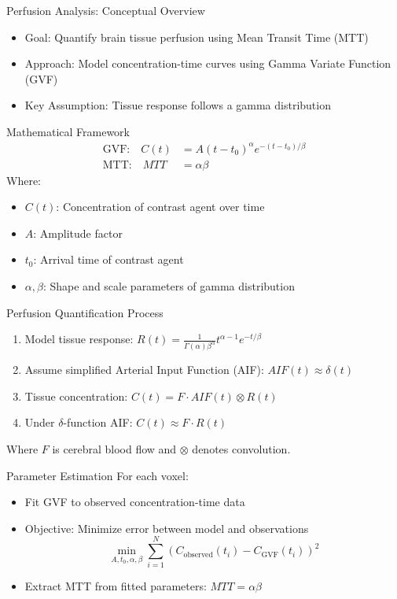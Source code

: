 \begin{frame}{Perfusion Analysis: Conceptual Overview}
\begin{itemize}
    \item Goal: Quantify brain tissue perfusion using Mean Transit Time (MTT)
    \item Approach: Model concentration-time curves using Gamma Variate Function (GVF)
    \item Key Assumption: Tissue response follows a gamma distribution
\end{itemize}
\end{frame}

\begin{frame}{Mathematical Framework}
\begin{align*}
    \text{GVF:} \quad C(t) &= A(t-t_0)^\alpha e^{-(t-t_0)/\beta} \\
    \text{MTT:} \quad MTT &= \alpha \beta
\end{align*}
Where:
\begin{itemize}
    \item $C(t)$: Concentration of contrast agent over time
    \item $A$: Amplitude factor
    \item $t_0$: Arrival time of contrast agent
    \item $\alpha, \beta$: Shape and scale parameters of gamma distribution
\end{itemize}
\end{frame}

\begin{frame}{Perfusion Quantification Process}
\begin{enumerate}
    \item Model tissue response: $R(t) = \frac{1}{\Gamma(\alpha)\beta^\alpha}t^{\alpha-1}e^{-t/\beta}$
    \item Assume simplified Arterial Input Function (AIF): $AIF(t) \approx \delta(t)$
    \item Tissue concentration: $C(t) = F \cdot AIF(t) \otimes R(t)$
    \item Under $\delta$-function AIF: $C(t) \approx F \cdot R(t)$
\end{enumerate}
Where $F$ is cerebral blood flow and $\otimes$ denotes convolution.
\end{frame}

\begin{frame}{Parameter Estimation}
For each voxel:
\begin{itemize}
    \item Fit GVF to observed concentration-time data
    \item Objective: Minimize error between model and observations
    \[ \min_{A,t_0,\alpha,\beta} \sum_{i=1}^{N} (C_{\text{observed}}(t_i) - C_{\text{GVF}}(t_i))^2 \]
    \item Extract MTT from fitted parameters: $MTT = \alpha \beta$
\end{itemize}
\end{frame}

